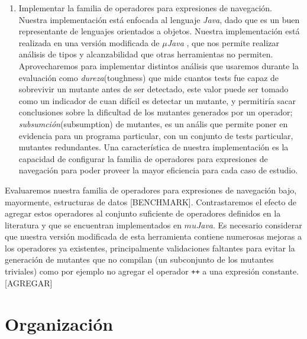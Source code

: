 \begin{enumerate}
	\item Implementar la familia de operadores para expresiones de navegaci\'on. Nuestra implementaci\'on est\'a enfocada al lenguaje \emph{Java}, dado que es un buen representante de lenguajes orientados a objetos. Nuestra implementaci\'on est\'a realizada en una versi\'on modificada de \emph{$\mu$Java} \cite{bibliography.mutation.tools.muJavaMaOK05}, que nos permite realizar an\'alisis de tipos y alcanzabilidad que otras herramientas no permiten. Aprovecharemos para implementar distintos an\'alisis que usaremos durante la evaluaci\'on como \emph{dureza}(toughness) que mide cuantos tests fue capaz de sobrevivir un mutante antes de ser detectado, este valor puede ser tomado como un indicador de cuan dif\'icil es detectar un mutante, y permitir\'ia sacar conclusiones sobre la dificultad de los mutantes generados por un operador; \emph{subsumci\'on}(subsumption) de mutantes, es un an\'alis que permite poner en evidencia para un programa particular, con un conjunto de tests particular, mutantes redundantes. Una caracter\'istica de nuestra implementaci\'on es la capacidad de configurar la familia de operadores para expresiones de navegaci\'on para poder proveer la mayor eficiencia para cada caso de estudio.
\end{enumerate}

Evaluaremos nuestra familia de operadores para expresiones de navegaci\'on bajo, mayormente, estructuras de datos [BENCHMARK]. Contrastaremos el efecto de agregar estos operadores al conjunto suficiente de operadores definidos en la literatura y que se encuentran implementados en \emph{$mu$Java}. Es necesario considerar que nuestra versi\'on modificada de esta herramienta contiene numerosas mejoras a los operadores ya existentes, principalmente validaciones faltantes para evitar la generaci\'on de mutantes que no compilan (un subconjunto de los mutantes triviales) como por ejemplo no agregar el operador \texttt{++} a una expresi\'on constante.
[AGREGAR]


\section{Organizaci\'on}
\label{sec:intro.organizacion}


